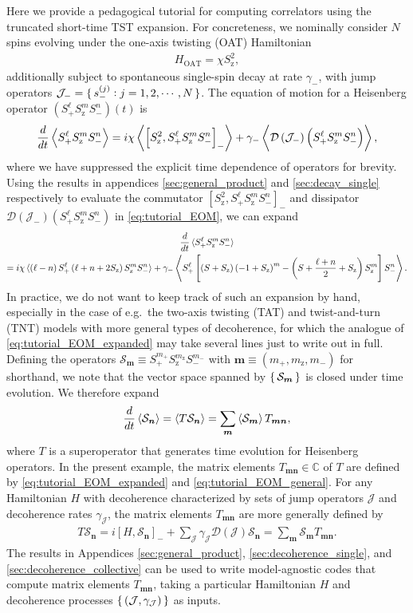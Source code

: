 \documentclass[aps,pra,twocolumn,longbibliography]{revtex4-2}
\renewcommand{\t}{\text} %
\newcommand{\f}[2]{\dfrac{#1}{#2}} %
\newcommand{\p}[1]{\left( #1 \right)} %
\renewcommand{\sp}[1]{\left[ #1 \right]} %
\renewcommand{\v}{\bm} %
\newcommand{\bk}{\braket} %
\newcommand{\Bk}{\Braket}
\newcommand{\D}{\mathcal{D}}
\newcommand{\J}{\mathcal{J}}
\renewcommand{\S}{\mathcal{S}}
\newcommand{\C}{\mathbb{C}}
\newcommand{\z}{\text{z}}
\newcommand{\1}{\mathds{1}}
\begin{document}
Here we provide a pedagogical tutorial for computing correlators using
the truncated short-time TST expansion.  For concreteness, we
nominally consider $N$ spins evolving under the one-axis twisting
(OAT) Hamiltonian
\begin{align}
  H_{\t{OAT}} = \chi S_\z^2,
\end{align}
additionally subject to spontaneous single-spin decay at rate
$\gamma_-$, with jump operators $\J_-=\set{s_-^{(j)}:j=1,2,\cdots,N}$.
The equation of motion for a Heisenberg operator
$\p{S_+^\ell S_\z^m S_-^n}\p{t}$ is
\begin{align}
  \f{d}{dt} \Bk{S_+^\ell S_\z^m S_-^n}
  = i\chi\Bk{\sp{S_\z^2, S_+^\ell S_\z^m S_-^n}_-}
  + \gamma_- \Bk{\D\p{\J_-}\p{S_+^\ell S_\z^m S_-^n}},
  \label{eq:tutorial_EOM}
\end{align}
where we have suppressed the explicit time dependence of operators for
brevity.  Using the results in appendices \ref{sec:general_product}
and \ref{sec:decay_single} respectively to evaluate the commutator
$\sp{S_\z^2, S_+^\ell S_\z^m S_-^n}_-$ and dissipator
$\D\p{\J_-} \p{S_+^\ell S_\z^m S_-^n}$ in \eqref{eq:tutorial_EOM}, we
can expand
\begin{multline}
  \f{d}{dt} \bk{S_+^\ell S_\z^m S_-^n} \\
  = i\chi \bk{\p{\ell-n} S_+^\ell \p{\ell+n+2S_\z} S_\z^m S_-^n}
  + \gamma_- \Bk{S_+^\ell \sp{\p{S+S_\z}\p{-1+S_\z}^m
      - \p{S+\f{\ell+n}{2}+S_\z} S_\z^m} S_-^n}.
  \label{eq:tutorial_EOM_expanded}
\end{multline}
In practice, we do not want to keep track of such an expansion by
hand, especially in the case of e.g.~the two-axis twisting (TAT) and
twist-and-turn (TNT) models with more general types of decoherence,
for which the analogue of \eqref{eq:tutorial_EOM_expanded} may take
several lines just to write out in full.  Defining the operators
$\S_{\v m}\equiv S_+^{m_+} S_\z^{m_\z} S_-^{m_-}$ with
$\v m\equiv\p{m_+,m_\z,m_-}$ for shorthand, we note that the vector
space spanned by $\set{\S_{\v m}}$ is closed under time evolution.  We
therefore expand
\begin{align}
  \f{d}{dt} \bk{\S_{\v n}}
  = \bk{T \S_{\v n}}
  = \sum_{\v m} \bk{\S_{\v m}} T_{\v m\v n},
  \label{eq:tutorial_EOM_general}
\end{align}
where $T$ is a superoperator that generates time evolution for
Heisenberg operators.  In the present example, the matrix elements
$T_{\v m\v n}\in\C$ of $T$ are defined by
\eqref{eq:tutorial_EOM_expanded} and \eqref{eq:tutorial_EOM_general}.
For any Hamiltonian $H$ with decoherence characterized by sets of jump
operators $\J$ and decoherence rates $\gamma_\J$, the matrix elements
$T_{\v m\v n}$ are more generally defined by
\begin{align}
  T \S_{\v n}
  = i\sp{H,\S_{\v n}}_-
  + \sum_\J \gamma_\J \D\p{\J} \S_{\v n}
  = \sum_{\v m} \S_{\v m} T_{\v m\v n}.
\end{align}
The results in Appendices \ref{sec:general_product},
\ref{sec:decoherence_single}, and \ref{sec:decoherence_collective} can
be used to write model-agnostic codes that compute matrix elements
$T_{\v m\v n}$, taking a particular Hamiltonian $H$ and decoherence
processes $\set{\p{\J,\gamma_\J}}$ as inputs.
\end{document}
